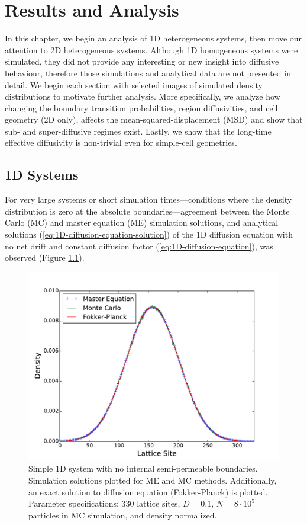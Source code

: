 \chapter{Results and Analysis}
\label{chapter:results-analysis}
	
	In this chapter, we begin an analysis of 1D heterogeneous systems, then move our attention to 2D heterogeneous systems. Although 1D homogeneous systems were simulated, they did not provide any interesting or new insight into diffusive behaviour, therefore those simulations and analytical data are not presented in detail. We begin each section with selected images of simulated density distributions to motivate further analysis. More specifically, we analyze how changing the boundary transition probabilities, region diffusivities, and cell geometry (2D only), affects the mean-squared-displacement (MSD) and show that sub- and super-diffusive regimes exist. Lastly, we show that the long-time effective diffusivity is non-trivial even for simple-cell geometries.
	
\section{1D Systems}
\label{sec:ra-1D}
	For very large systems or short simulation times---conditions where the density distribution is zero at the absolute boundaries---agreement between the Monte Carlo (MC) and master equation (ME) simulation solutions, and analytical solutions (\ref{eq:1D-diffusion-equation-solution}) of the 1D diffusion equation with no net drift and constant diffusion factor (\ref{eq:1D-diffusion-equation}), was observed (Figure \ref{fig:11U_homogeneous_plots_1D}). 

	\begin{figure}[h]
		\centering
		\includegraphics[width=1.0\linewidth]{../images/1D/11U_homogeneous_plots_1D}
		\caption[1D: MC, ME, and analytical solutions for a homogenous system]{Simple 1D system with no internal semi-permeable boundaries. Simulation solutions plotted for ME and MC methods. Additionally, an exact solution to diffusion equation (Fokker-Planck) is plotted. Parameter specifications: 330 lattice sites, $ D = 0.1 $, $ N = 8\cdot10^5 $ particles in MC simulation, and density normalized.}
		\label{fig:11U_homogeneous_plots_1D}
	\end{figure}
	
